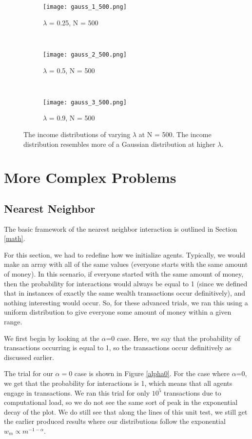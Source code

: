 \documentclass[11pt]{article}
\begin{document}
	\begin{figure*}[h!]
		\begin{subfigure}{0.3\textwidth}
			\texttt{[image: gauss\_1\_500.png]}
			\caption{$\lambda$ = 0.25, N = 500}
		\end{subfigure}
		~
		\begin{subfigure}{0.3\textwidth}
			\texttt{[image: gauss\_2\_500.png]}
			\caption{$\lambda$ = 0.5, N = 500}
		\end{subfigure}
		~
		\begin{subfigure}{0.3\textwidth}
			\texttt{[image: gauss\_3\_500.png]}
			\caption{$\lambda$ = 0.9, N = 500}
		\end{subfigure}
		\caption{The income distributions of varying $\lambda$ at N = 500. The income distribution resembles more of a Gaussian distribution at higher $\lambda$.}
		\label{gauss}
	\end{figure*}
	
	\section{More Complex Problems}
	\subsection{Nearest Neighbor}
	The basic framework of the nearest neighbor interaction is outlined in Section \ref{math}. 
	
	For this section, we had to redefine how we initialize agents. Typically, we would make an array with all of the same values (everyone starts with the same amount of money). In this scenario, if everyone started with the same amount of money, then the probability for interactions would always be equal to 1 (since we defined that in instances of exactly the same wealth transactions occur definitively), and nothing interesting would occur. So, for these advanced trials, we ran this using a uniform distribution to give everyone some amount of money within a given range. 
	
	We first begin by looking at the $\alpha$=0 case. Here, we say that the probability of transactions occurring is equal to 1, so the transactions occur definitively as discussed earlier. 
	
	The trial for our $\alpha=0$ case is shown in Figure \ref{alpha0}. For the case where $\alpha$=0, we get that the probability for interactions is 1, which means that all agents engage in transactions. We ran this trial for only $10^5$ transactions due to computational load, so we do not see the same sort of peak in the exponential decay of the plot. We do still see that along the lines of this unit test, we still get the earlier produced results where our distributions follow the exponential $w_m \propto m^{-1-\alpha}$. 
	
\end{document}
